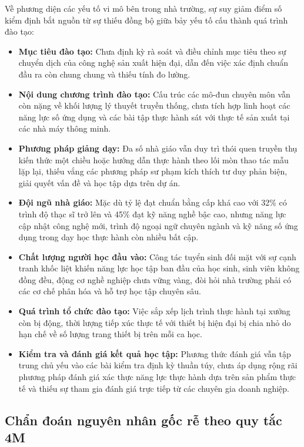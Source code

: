 Về phương diện các yếu tố vi mô bên trong nhà trường, sự suy giảm điểm số kiểm định bắt nguồn từ sự thiếu đồng bộ giữa bảy yếu tố cấu thành quá trình đào tạo:
\begin{itemize}
    \item \textbf{Mục tiêu đào tạo:} Chưa định kỳ rà soát và điều chỉnh mục tiêu theo sự chuyển dịch của công nghệ sản xuất hiện đại, dẫn đến việc xác định chuẩn đầu ra còn chung chung và thiếu tính đo lường.
    \item \textbf{Nội dung chương trình đào tạo:} Cấu trúc các mô-đun chuyên môn vẫn còn nặng về khối lượng lý thuyết truyền thống, chưa tích hợp linh hoạt các năng lực số ứng dụng và các bài tập thực hành sát với thực tế sản xuất tại các nhà máy thông minh.
    \item \textbf{Phương pháp giảng dạy:} Đa số nhà giáo vẫn duy trì thói quen truyền thụ kiến thức một chiều hoặc hướng dẫn thực hành theo lối mòn thao tác mẫu lặp lại, thiếu vắng các phương pháp sư phạm kích thích tư duy phản biện, giải quyết vấn đề và học tập dựa trên dự án.
    \item \textbf{Đội ngũ nhà giáo:} Mặc dù tỷ lệ đạt chuẩn bằng cấp khá cao với 32\% có trình độ thạc sĩ trở lên và 45\% đạt kỹ năng nghề bậc cao, nhưng năng lực cập nhật công nghệ mới, trình độ ngoại ngữ chuyên ngành và kỹ năng số ứng dụng trong dạy học thực hành còn nhiều bất cập.
    \item \textbf{Chất lượng người học đầu vào:} Công tác tuyển sinh đối mặt với sự cạnh tranh khốc liệt khiến năng lực học tập ban đầu của học sinh, sinh viên không đồng đều, động cơ nghề nghiệp chưa vững vàng, đòi hỏi nhà trường phải có các cơ chế phân hóa và hỗ trợ học tập chuyên sâu.
    \item \textbf{Quá trình tổ chức đào tạo:} Việc sắp xếp lịch trình thực hành tại xưởng còn bị động, thời lượng tiếp xúc thực tế với thiết bị hiện đại bị chia nhỏ do hạn chế về số lượng trang thiết bị trên mỗi ca học.
    \item \textbf{Kiểm tra và đánh giá kết quả học tập:} Phương thức đánh giá vẫn tập trung chủ yếu vào các bài kiểm tra định kỳ thuần túy, chưa áp dụng rộng rãi phương pháp đánh giá xác thực năng lực thực hành dựa trên sản phẩm thực tế và thiếu sự tham gia đánh giá trực tiếp từ các chuyên gia doanh nghiệp.
\end{itemize}

\subsection{Chẩn đoán nguyên nhân gốc rễ theo quy tắc 4M}

